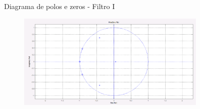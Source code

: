 \documentclass{beamer}
\begin{document}
	\begin{frame}{Diagrama de polos e zeros - Filtro I}
		\begin{figure}[ht]
			\centering
			\includegraphics[width=9cm]{../pictures/Filtro1/DiagramaFiltro1.png}
			\label{fig:magnitude1}
		\end{figure}
	\end{frame}
\end{document}
